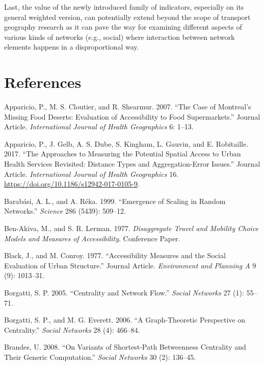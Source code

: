 \documentclass[]{elsarticle} %
\begin{document}
Last, the value of the newly introduced family of indicators, especially
on its general weighted version, can potentially extend beyond the scope
of transport geography research as it can pave the way for examining
different aspects of various kinds of networks (e.g., social) where
interaction between network elements happens in a disproportional way.

\hypertarget{references}{%
\section*{References}\label{references}}

\hypertarget{refs}{}
\leavevmode\hypertarget{ref-Apparicio2007}{}%
Apparicio, P., M. S. Cloutier, and R. Shearmur. 2007. ``The Case of
Montreal's Missing Food Deserts: Evaluation of Accessibility to Food
Supermarkets.'' Journal Article. \emph{International Journal of Health
Geographics} 6: 1--13.

\leavevmode\hypertarget{ref-Apparicio2017}{}%
Apparicio, P., J. Gelb, A. S. Dube, S. Kingham, L. Gauvin, and E.
Robitaille. 2017. ``The Approaches to Measuring the Potential Spatial
Access to Urban Health Services Revisited: Distance Types and
Aggregation-Error Issues.'' Journal Article. \emph{International Journal
of Health Geographics} 16.
\url{https://doi.org/10.1186/s12942-017-0105-9}.

\leavevmode\hypertarget{ref-barabasi1999}{}%
Barabási, A. L., and A. Réka. 1999. ``Emergence of Scaling in Random
Networks.'' \emph{Science} 286 (5439): 509--12.

\leavevmode\hypertarget{ref-BenAkiva1977accessibility}{}%
Ben-Akiva, M., and S. R. Lerman. 1977. \emph{Disaggregate Travel and
Mobility Choice Models and Measures of Accessibility}. Conference Paper.

\leavevmode\hypertarget{ref-Black1977}{}%
Black, J., and M. Conroy. 1977. ``Accessibility Measures and the Social
Evaluation of Urban Structure.'' Journal Article. \emph{Environment and
Planning A} 9 (9): 1013--31.

\leavevmode\hypertarget{ref-Borgatti2005centrality}{}%
Borgatti, S. P. 2005. ``Centrality and Network Flow.'' \emph{Social
Networks} 27 (1): 55--71.

\leavevmode\hypertarget{ref-Borgatti2006}{}%
Borgatti, S. P., and M. G. Everett. 2006. ``A Graph-Theoretic
Perspective on Centrality.'' \emph{Social Networks} 28 (4): 466--84.

\leavevmode\hypertarget{ref-Brandes2008}{}%
Brandes, U. 2008. ``On Variants of Shortest-Path Betweenness Centrality
and Their Generic Computation.'' \emph{Social Networks} 30 (2): 136--45.
\end{document}
